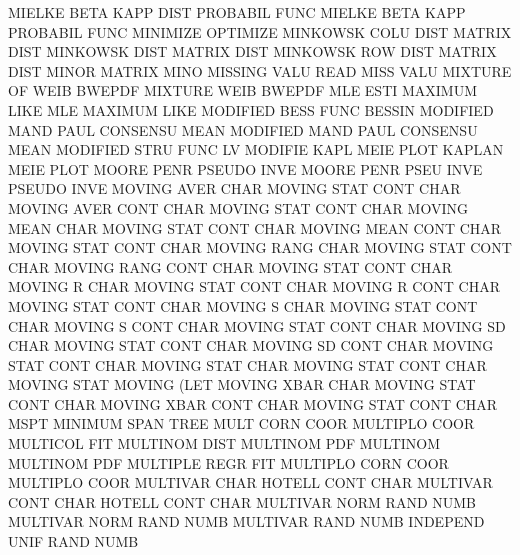 MIELKE   BETA KAPP DIST                 PROBABIL FUNC
MIELKE   BETA KAPP                      PROBABIL FUNC
MINIMIZE                                OPTIMIZE
MINKOWSK COLU DIST                      MATRIX   DIST
MINKOWSK DIST                           MATRIX   DIST
MINKOWSK ROW  DIST                      MATRIX   DIST
MINOR                                   MATRIX   MINO
MISSING  VALU                           READ     MISS VALU 
MIXTURE  OF   WEIB                      BWEPDF
MIXTURE  WEIB                           BWEPDF
MLE      ESTI                           MAXIMUM  LIKE
MLE                                     MAXIMUM  LIKE
MODIFIED BESS FUNC                      BESSIN
MODIFIED MAND PAUL                      CONSENSU MEAN
MODIFIED MAND PAUL                      CONSENSU MEAN
MODIFIED STRU FUNC                      LV
MODIFIE  KAPL MEIE PLOT                 KAPLAN   MEIE PLOT
MOORE    PENR                           PSEUDO   INVE
MOORE    PENR PSEU INVE                 PSEUDO   INVE
MOVING   AVER CHAR                      MOVING   STAT CONT CHAR
MOVING   AVER CONT CHAR                 MOVING   STAT CONT CHAR
MOVING   MEAN CHAR                      MOVING   STAT CONT CHAR
MOVING   MEAN CONT CHAR                 MOVING   STAT CONT CHAR
MOVING   RANG CHAR                      MOVING   STAT CONT CHAR
MOVING   RANG CONT CHAR                 MOVING   STAT CONT CHAR
MOVING   R    CHAR                      MOVING   STAT CONT CHAR
MOVING   R    CONT CHAR                 MOVING   STAT CONT CHAR
MOVING   S    CHAR                      MOVING   STAT CONT CHAR
MOVING   S    CONT CHAR                 MOVING   STAT CONT CHAR
MOVING   SD   CHAR                      MOVING   STAT CONT CHAR
MOVING   SD   CONT CHAR                 MOVING   STAT CONT CHAR
MOVING   STAT CHAR                      MOVING   STAT CONT CHAR
MOVING   STAT                           MOVING   (LET
MOVING   XBAR CHAR                      MOVING   STAT CONT CHAR
MOVING   XBAR CONT CHAR                 MOVING   STAT CONT CHAR
MSPT                                    MINIMUM  SPAN TREE
MULT     CORN COOR                      MULTIPLO COOR
MULTICOL                                FIT
MULTINOM DIST                           MULTINOM PDF
MULTINOM                                MULTINOM PDF
MULTIPLE REGR                           FIT
MULTIPLO CORN COOR                      MULTIPLO COOR
MULTIVAR CHAR                           HOTELL   CONT CHAR
MULTIVAR CONT CHAR                      HOTELL   CONT CHAR
MULTIVAR NORM RAND NUMB                 MULTIVAR NORM RAND NUMB
MULTIVAR RAND NUMB                      INDEPEND UNIF RAND NUMB
